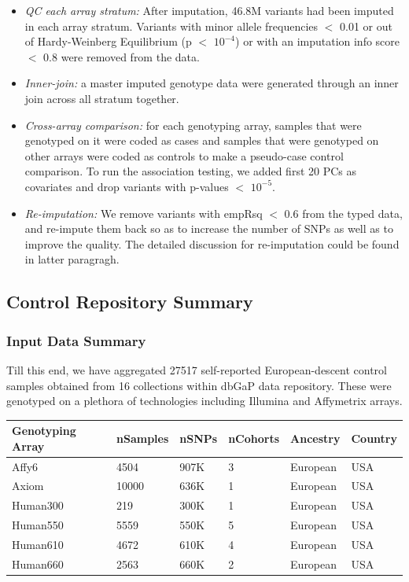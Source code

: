 \documentclass[12pt]{amsart}
\begin{document}
\begin{itemize}
\item \emph{QC each array stratum: } After imputation, 46.8M variants had been imputed in each array stratum. Variants with minor allele frequencies $<$ 0.01 or out of Hardy-Weinberg Equilibrium (p $<$ $10^{-4}$) or with an imputation info score $<$ 0.8 were removed from the data.
\item \emph{Inner-join: } a master imputed genotype data were generated through an inner join across all stratum together.
\item \emph{Cross-array comparison: }for each genotyping array, samples that were genotyped on it were coded as cases and samples that were genotyped on other arrays were coded as controls to make a pseudo-case control comparison. To run the association testing, we added first 20 PCs as covariates and drop variants with p-values $<$ $10^{-5}$.
\item \emph{Re-imputation:} We remove variants with empRsq $<$ 0.6 from the typed data, and re-impute them back so as to increase the number of SNPs as well as to improve the quality. The detailed discussion for re-imputation could be found in latter paragragh.
\end{itemize}

\subsection{Control Repository Summary}


\subsubsection{Input Data Summary}
Till this end, we have aggregated 27517 self-reported European-descent control samples obtained from 16 collections within dbGaP data repository. These were genotyped on a plethora of technologies including Illumina and Affymetrix arrays. 

\begin{table}[H]
\begin{tabular}{llllll}
\hline
Genotyping Array & nSamples & nSNPs & nCohorts & Ancestry & Country \\
\hline
Affy6                 & 4504   & 907K  & 3  & European & USA \\
Axiom                 & 10000  & 636K  & 1  &
European & USA \\
Human300             & 219    & 300K  & 1  &
European & USA \\
Human550              & 5559   & 550K  & 5  & European & USA \\
Human610              & 4672   & 610K  & 4  & European & USA \\
Human660              & 2563   & 660K  & 2  & European & USA \\
\hline
\end{tabular}
\end{table}
\end{document}
